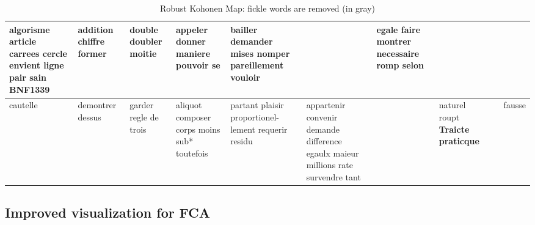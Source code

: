 \documentclass[runningheads,a4paper]{llncs}
\begin{document}
\begin{table}[h!]
{\begin{tabular}{|p{1.9cm}|p{1.9cm}|p{1.9cm}|p{1.9cm}|p{1.9cm}|p{1.9cm}|p{1.9cm}|p{1.9cm}|p{1.9cm}|p{1.9cm}|}
\hline
algorisme article carrees cercle envient ligne pair sain \cellcolor{grisclair} \textbf{BNF1339} & addition chiffre former &  \textcolor{gris}{double}  \textcolor{gris}{doubler} moitie & appeler  \textcolor{gris}{donner}  \textcolor{gris}{maniere}  \textcolor{gris}{pouvoir}  \textcolor{gris}{se}& bailler demander mises nomper pareillement vouloir & & egale faire montrer necessaire romp selon & & & \\
\hline
cautelle & demontrer dessus &  \textcolor{gris}{garder}  \textcolor{gris}{regle}  \textcolor{gris}{de}  \textcolor{gris}{trois} & aliquot composer corps moins sub* toutefois & partant plaisir proportionel- lement requerir residu & appartenir convenir demande difference egaulx maieur millions rate survendre tant & & naturel roupt \cellcolor{grisclair} \textbf{Traicte praticque} & & fausse\\
\hline
\end{tabular}
}
\caption{Robust Kohonen Map: fickle words are removed (in gray)}
\end{table}



\subsection{Improved visualization for FCA}
\end{document}
